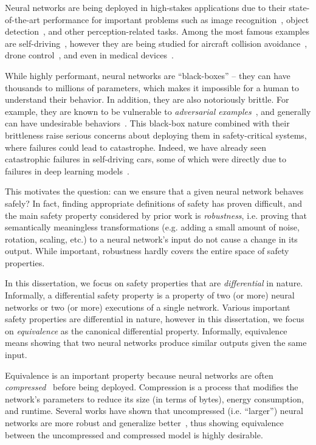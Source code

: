Neural networks are being deployed in high-stakes applications due to their
state-of-the-art performance for important problems such as image
recognition~\cite{he2016deep}, object detection~\cite{redmon2016you}, and other
perception-related tasks. Among the most famous examples are
self-driving~\cite{grigorescu2020survey}, however they are being studied for
aircraft collision avoidance~\cite{JulianKO18}, drone control~\cite{caps2021}, and
even in medical devices~\cite{tan2021toward}.

While highly performant, neural networks are ``black-boxes'' -- they can have
thousands to millions of parameters, which makes it impossible for a human to
understand their behavior. In addition, they are also notoriously brittle. For
example, they are known to be vulnerable to \textit{adversarial
examples}~\cite{szegedy2013intriguing}, and generally can have undesirable
behaviors~\cite{KatzBDJK17}. This black-box nature combined with their brittleness
raise serious concerns about deploying them in safety-critical systems, where
failures could lead to catastrophe. Indeed, we have already seen catastrophic
failures in self-driving cars, some of which were directly due to failures in deep
learning models~\cite{phil_mccausland_2019}.

This motivates the question: can we ensure that a given neural network behaves
safely? In fact, finding appropriate definitions of safety has proven difficult,
and the main safety property considered by prior work is \textit{robustness},
i.e. proving that semantically meaningless transformations (e.g. adding a small
amount of noise, rotation, scaling, etc.) to a neural network's
input do not cause a change in its output. While important, robustness hardly
covers the entire space of safety properties.

In this dissertation, we focus on safety properties that are
\textit{differential} in nature. Informally, a differential safety property
is a property of two (or more) neural networks or two (or more) executions of a
single network. Various important safety
properties are differential in nature, however in this dissertation, we focus on
\textit{equivalence} as the canonical differential property. Informally,
equivalence means showing that two neural networks produce similar outputs given
the same input.

Equivalence is an important property because neural networks are often
\textit{compressed}~\cite{HanMD16} before being deployed. Compression is a
process that modifies the network's parameters to reduce its size (in terms of
bytes), energy consumption, and runtime. Several works have shown that
uncompressed (i.e. ``larger'') neural networks are more robust and generalize
better~\cite{bubeck2021universal,brutzkus2019larger}, thus showing equivalence
between the uncompressed and compressed model is highly desirable.

